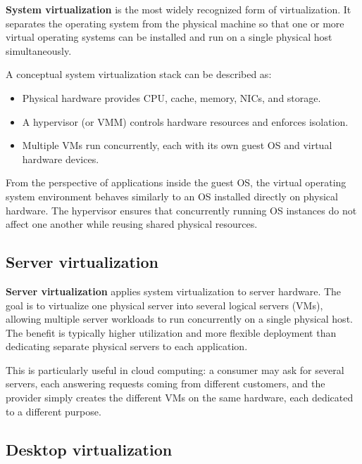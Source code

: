 \textbf{System virtualization} is the most widely recognized form of virtualization. It separates the operating system from the physical machine so that one or more virtual operating systems can be installed and run on a single physical host simultaneously.

A conceptual system virtualization stack can be described as:

\begin{itemize}
\item Physical hardware provides CPU, cache, memory, NICs, and storage.
\item A hypervisor (or VMM) controls hardware resources and enforces isolation.
\item Multiple VMs run concurrently, each with its own guest OS and virtual hardware devices.
\end{itemize}

From the perspective of applications inside the guest OS, the virtual operating system environment behaves similarly to an OS installed directly on physical hardware. The hypervisor ensures that concurrently running OS instances do not affect one another while reusing shared physical resources.

\begin{center}
\end{center}


\subsection{Server virtualization}

\textbf{Server virtualization} applies system virtualization to server hardware. The goal is to virtualize one physical server into several logical servers (VMs), allowing multiple server workloads to run concurrently on a single physical host. The benefit is typically higher utilization and more flexible deployment than dedicating separate physical servers to each application.

This is particularly useful in cloud computing: a consumer may ask for several servers, each answering requests coming from different customers, and the provider simply creates the different VMs on the same hardware, each dedicated to a different purpose.

\begin{center}
\end{center}

\subsection{Desktop virtualization}

